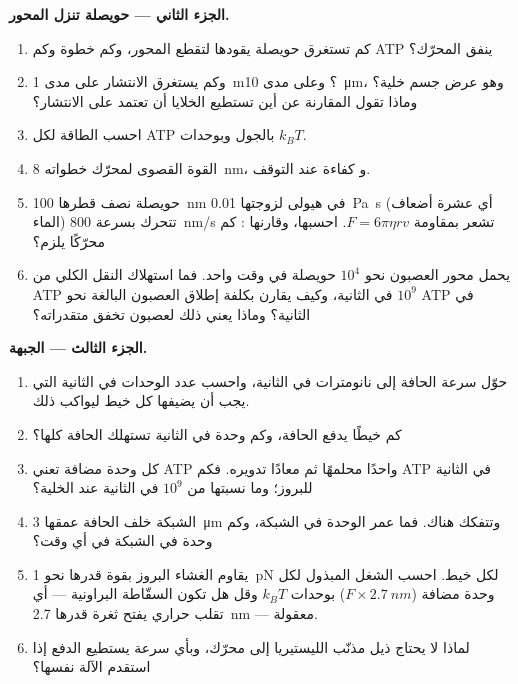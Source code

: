 \begin{problem}
\medskip
\noindent\textbf{الجزء الثاني --- حويصلة تنزل المحور.}
\begin{enumerate}[resume]
  \item كم تستغرق حويصلة يقودها  لتقطع المحور،
        وكم خطوة وكم ATP ينفق المحرّك؟
  \item وكم يستغرق الانتشار على مدى \qty{1}{m}؟ وعلى مدى
        \qty{10}{\micro m}، وهو عرض جسم خلية؟ وماذا تقول
        المقارنة عن أين تستطيع الخلايا أن تعتمد على
        الانتشار؟
  \item احسب الطاقة لكل ATP بالجول وبوحدات $k_{B}T$.
  \item القوة القصوى لمحرّك خطواته \qty{8}{nm}، و
        كفاءة  عند التوقف.
  \item حويصلة نصف قطرها \qty{100}{nm} في هيولى لزوجتها
        \qty{0.01}{Pa.s} (أي عشرة أضعاف الماء) تتحرك بسرعة \qty{800}{nm/s}
        تشعر بمقاومة $F = 6\pi\eta r v$. احسبها، وقارنها : كم محرّكًا يلزم؟
  \item يحمل محور العصبون نحو $10^{4}$ حويصلة في وقت واحد. فما
        استهلاك النقل الكلي من ATP في الثانية، وكيف
        يقارن بكلفة إطلاق العصبون البالغة نحو
        $10^{9}$ ATP في الثانية؟ وماذا يعني ذلك لعصبون
        تخفق متقدراته؟
\end{enumerate}

\medskip
\noindent\textbf{الجزء الثالث --- الجبهة.}
\begin{enumerate}[resume]
  \item حوّل سرعة الحافة إلى نانومترات في الثانية، واحسب
        عدد الوحدات في الثانية التي يجب أن يضيفها كل خيط ليواكب
        ذلك.
  \item كم خيطًا يدفع الحافة، وكم وحدة في
        الثانية تستهلك الحافة كلها؟
  \item كل وحدة مضافة تعني ATP واحدًا محلمهًا ثم معادًا تدويره.
        فكم ATP في الثانية للبروز؛ وما نسبتها من $10^{9}$
        في الثانية عند الخلية؟
  \item الشبكة خلف الحافة عمقها \qty{3}{\micro m} وتتفكك
        هناك. فما عمر الوحدة في الشبكة، وكم وحدة
        في الشبكة في أي وقت؟
  \item يقاوم الغشاء البروز بقوة قدرها نحو
        \qty{1}{pN} لكل خيط. احسب الشغل المبذول لكل وحدة
        مضافة ($F\times \qty{2.7}{nm}$) بوحدات $k_{B}T$ وقل هل تكون
        السقّاطة البراونية --- أي تقلب حراري يفتح ثغرة قدرها
        \qty{2.7}{nm} --- معقولة.
  \item لماذا لا يحتاج ذيل مذنّب الليستيريا إلى محرّك، وبأي سرعة
        يستطيع الدفع إذا استقدم الآلة نفسها؟
\end{enumerate}


\end{problem}

